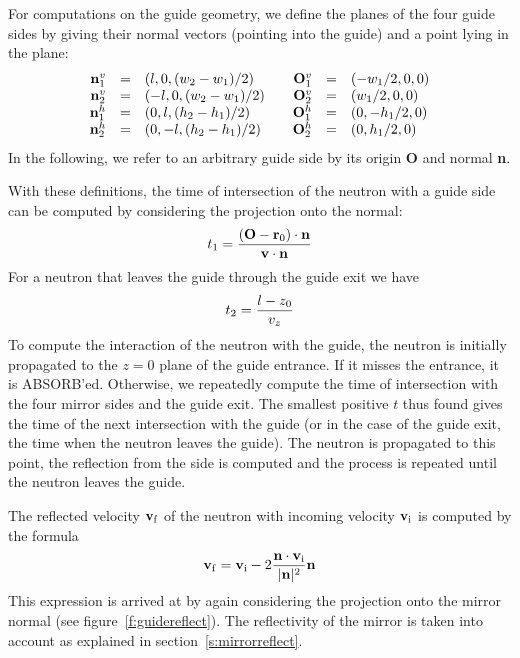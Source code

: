 For computations on the guide geometry, we define the planes of the four
guide sides by giving their normal vectors (pointing into the guide)
and a point lying in the plane:
$$
\begin{array}{rclcrcl}
{\bf n}^v_1 &=& (l, 0, {(w_2 - w_1) / 2})
     & & {\bf O}^v_1 &=& (- w_1 / 2, 0, 0) \\
{\bf n}^v_2 &=& (-l, 0, {(w_2 - w_1) / 2})
     & & {\bf O}^v_2 &=& (w_1 / 2, 0, 0) \\
{\bf n}^h_1 &=& (0, l, {(h_2 - h_1) / 2})
     & & {\bf O}^h_1 &=& (0, - h_1 / 2, 0) \\
{\bf n}^h_2 &=& (0, -l, {(h_2 - h_1) / 2})
     & & {\bf O}^h_2 &=& (0, h_1 / 2, 0) \\
\end{array}
$$
In the following, we refer to an arbitrary guide side by its origin
{\bf O} and normal {\bf n}.

With these definitions, the time of intersection of the neutron with a
guide side can be computed by considering the projection onto the
normal:
\begin{equation} 
t_1 = {({\bf O} - {\bf r}_0) \cdot {\bf n} \over {\bf v} \cdot {\bf n}} 
\end{equation}
For a neutron that leaves the guide through the guide exit we have
\begin{equation}
t_2 = {l - z_0 \over v_z} 
\end{equation}
To compute the interaction of the neutron
with the guide, the neutron is initially propagated to the $z = 0$ plane of the
guide entrance. If it misses the entrance, it is ABSORB'ed. Otherwise,
we repeatedly compute the time of intersection with the
four mirror sides and the guide exit. The smallest positive $t$ thus
found gives the time of the next intersection with the guide (or in the
case of the guide exit, the time when the neutron leaves the guide). The
neutron is propagated to this point, the reflection from the side is
computed and the process is repeated until the neutron leaves the guide.

The reflected velocity ${\bf v}_{\rm f}$ of the neutron with incoming velocity
${\bf v}_{\rm i}$ is computed by the formula
\begin{equation}
 {\bf v}_{\rm f} = 
  {\bf v}_{\rm i} 
   - 2{{\bf n} \cdot {\bf v}_{\rm i} \over {|{\bf n}|^2}} {\bf n}
\end{equation}
This expression is arrived at by again considering the projection onto
the mirror normal (see figure~\ref{f:guidereflect}). The reflectivity of the
mirror is taken into account as explained in section~\ref{s:mirrorreflect}.


